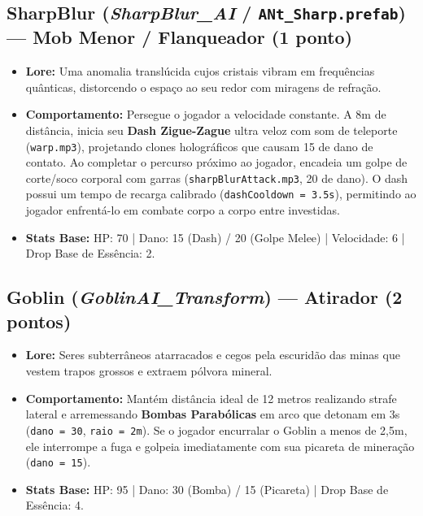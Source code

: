 \documentclass[a4paper,12pt]{report}
\begin{document}
\subsection{SharpBlur (\textit{SharpBlur\_AI} / \texttt{ANt\_Sharp.prefab}) --- Mob Menor / Flanqueador (1 ponto)}
\begin{itemize}
    \item \textbf{Lore:} Uma anomalia translúcida cujos cristais vibram em frequências quânticas, distorcendo o espaço ao seu redor com miragens de refração.
    \item \textbf{Comportamento:} Persegue o jogador a velocidade constante. A 8m de distância, inicia seu \textbf{Dash Zigue-Zague} ultra veloz com som de teleporte (\texttt{warp.mp3}), projetando clones holográficos que causam 15 de dano de contato. Ao completar o percurso próximo ao jogador, encadeia um golpe de corte/soco corporal com garras (\texttt{sharpBlurAttack.mp3}, 20 de dano). O dash possui um tempo de recarga calibrado (\texttt{dashCooldown = 3.5s}), permitindo ao jogador enfrentá-lo em combate corpo a corpo entre investidas.
    \item \textbf{Stats Base:} HP: 70 | Dano: 15 (Dash) / 20 (Golpe Melee) | Velocidade: 6 | Drop Base de Essência: 2.
\end{itemize}

\subsection{Goblin (\textit{GoblinAI\_Transform}) --- Atirador (2 pontos)}
\begin{itemize}
    \item \textbf{Lore:} Seres subterrâneos atarracados e cegos pela escuridão das minas que vestem trapos grossos e extraem pólvora mineral.
    \item \textbf{Comportamento:} Mantém distância ideal de 12 metros realizando strafe lateral e arremessando \textbf{Bombas Parabólicas} em arco que detonam em 3s (\texttt{dano = 30}, \texttt{raio = 2m}). Se o jogador encurralar o Goblin a menos de 2,5m, ele interrompe a fuga e golpeia imediatamente com sua picareta de mineração (\texttt{dano = 15}).
    \item \textbf{Stats Base:} HP: 95 | Dano: 30 (Bomba) / 15 (Picareta) | Drop Base de Essência: 4.
\end{itemize}
\end{document}
